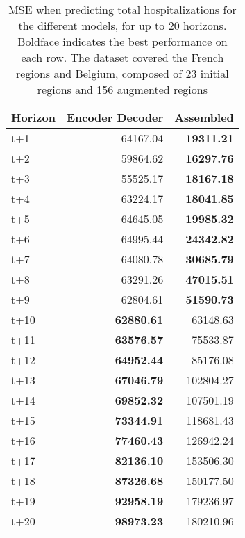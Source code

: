 \begin{table}[H]
\centering
\caption{MSE when predicting total hospitalizations for the different models, for up to 20 horizons. Boldface indicates the best performance on each row. The dataset covered the French regions and Belgium, composed of 23 initial regions and 156 augmented regions }
\label{tab:MSE_comparison}
\begin{tabular}{lrr}
\toprule
Horizon &  Encoder Decoder &  Assembled \\
\midrule
t+1  & 64167.04  & \textbf{19311.21}  \\
t+2  & 59864.62  & \textbf{16297.76}  \\
t+3  & 55525.17  & \textbf{18167.18}  \\
t+4  & 63224.17  & \textbf{18041.85}  \\
t+5  & 64645.05  & \textbf{19985.32}  \\
t+6  & 64995.44  & \textbf{24342.82}  \\
t+7  & 64080.78  & \textbf{30685.79}  \\
t+8  & 63291.26  & \textbf{47015.51}  \\
t+9  & 62804.61  & \textbf{51590.73}  \\
t+10  & \textbf{62880.61}  & 63148.63  \\
t+11  & \textbf{63576.57}  & 75533.87  \\
t+12  & \textbf{64952.44}  & 85176.08  \\
t+13  & \textbf{67046.79}  & 102804.27  \\
t+14  & \textbf{69852.32}  & 107501.19  \\
t+15  & \textbf{73344.91}  & 118681.43  \\
t+16  & \textbf{77460.43}  & 126942.24  \\
t+17  & \textbf{82136.10}  & 153506.30  \\
t+18  & \textbf{87326.68}  & 150177.50  \\
t+19  & \textbf{92958.19}  & 179236.97  \\
t+20  & \textbf{98973.23}  & 180210.96  \\

\bottomrule
\end{tabular}
\end{table}
